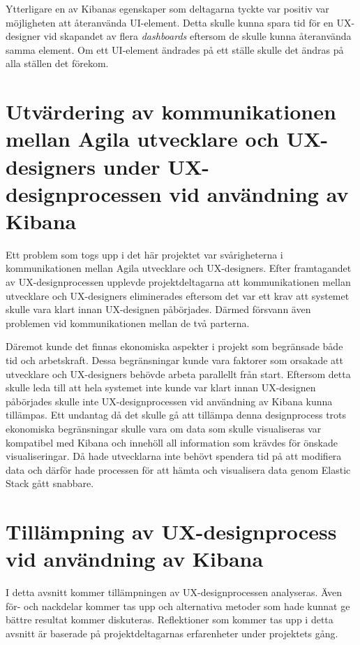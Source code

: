 \documentclass[12pt]{kththesis}
\begin{document}
Ytterligare en av Kibanas egenskaper som deltagarna tyckte var positiv var möjligheten att återanvända UI-element. Detta skulle kunna spara tid för en UX-designer vid skapandet av flera \textit{dashboards} eftersom de skulle kunna återanvända samma element. Om ett UI-element ändrades på ett ställe skulle det ändras på alla ställen det förekom.

\section{Utvärdering av kommunikationen mellan Agila utvecklare och UX-designers under UX-designprocessen vid användning av Kibana}
Ett problem som togs upp i det här projektet var svårigheterna i kommunikationen mellan Agila utvecklare och UX-designers. Efter framtagandet av UX-designprocessen upplevde projektdeltagarna att kommunikationen mellan utvecklare och UX-designers eliminerades eftersom det var ett krav att systemet skulle vara klart innan UX-designen påbörjades. Därmed försvann även problemen vid kommunikationen mellan de två parterna. 

Däremot kunde det finnas ekonomiska aspekter i projekt som begränsade både tid och arbetskraft. Dessa begränsningar kunde vara faktorer som orsakade att utvecklare och UX-designers behövde arbeta parallellt från start. Eftersom detta skulle leda till att hela systemet inte kunde var klart innan UX-designen påbörjades skulle inte UX-designprocessen vid användning av Kibana kunna tillämpas. Ett undantag då det skulle gå att tillämpa denna designprocess trots ekonomiska begränsningar skulle vara om data som skulle visualiseras var kompatibel med Kibana och innehöll all information som krävdes för önskade visualiseringar. Då hade utvecklarna inte behövt spendera tid på att modifiera data och därför hade processen för att hämta och visualisera data genom Elastic Stack gått snabbare.

\section{Tillämpning av UX-designprocess vid användning av Kibana} 
I detta avsnitt kommer tillämpningen av UX-designprocessen analyseras. Även för- och nackdelar kommer tas upp och alternativa metoder som hade kunnat ge bättre resultat kommer diskuteras.  Reflektioner som kommer tas upp i detta avsnitt är baserade på projektdeltagarnas erfarenheter under projektets gång.
\end{document}
